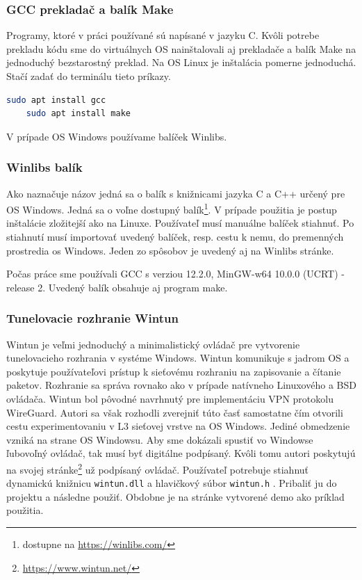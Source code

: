 \subsubsection{GCC prekladač a balík Make}
Programy, ktoré v práci používané sú napísané v jazyku C. Kvôli potrebe prekladu kódu sme do virtuálnych OS nainštalovali aj prekladače a balík Make na jednoduchý bezstarostný preklad.
Na OS Linux je inštalácia pomerne jednoduchá. Stačí zadať do terminálu tieto príkazy.
\begin{lstlisting}[language=bash]
	sudo apt install gcc
	sudo apt install make
\end{lstlisting}  
V prípade OS Windows používame balíček Winlibs. 

\subsubsection{Winlibs balík}
Ako naznačuje názov jedná sa o balík s knižnicami jazyka C a C++ určený pre OS Windows. Jedná sa o voľne dostupný balík\footnote{dostupne na \href{https://winlibs.com/}{https://winlibs.com/}}. V prípade použitia je postup inštalácie zložitejší ako na Linuxe. Používateľ musí manuálne balíček stiahnuť. Po stiahnutí musí importovať uvedený balíček, resp. cestu k nemu, do premenných prostredia \acrshort{os} Windows. Jeden zo spôsobov je uvedený aj na Winlibs stránke. 

Počas práce sme používali GCC s verziou 12.2.0, MinGW-w64 10.0.0 (UCRT) - release 2. Uvedený balík obsahuje aj program make.  
\subsubsection{Tunelovacie rozhranie Wintun}
Wintun je veľmi jednoduchý a minimalistický ovládač pre vytvorenie tunelovacieho rozhrania v systéme Windows. Wintun komunikuje s jadrom OS a poskytuje používateľovi prístup k sieťovému rozhraniu na zapisovanie a čítanie paketov. Rozhranie sa správa rovnako ako v prípade natívneho Linuxového a BSD ovládača. Wintun bol pôvodné navrhnutý pre implementáciu VPN protokolu WireGuard. Autori sa však rozhodli zverejniť túto časť samostatne čím otvorili cestu experimentovaniu v L3 sieťovej vrstve na OS Windows. Jediné obmedzenie vzniká na strane OS Windowsu. Aby sme dokázali spustiť vo Windowse ľubovoľný ovládač, tak musí byť digitálne podpísaný. Kvôli tomu autori poskytujú na svojej stránke\footnote{\url{https://www.wintun.net/}} už podpísaný ovládač. Používateľ potrebuje stiahnuť dynamickú knižnicu \lstinline|wintun.dll| a hlavičkový súbor \lstinline|wintun.h| . Pribaliť ju do projektu a následne použiť. Obdobne je na stránke vytvorené demo ako príklad použitia. 

